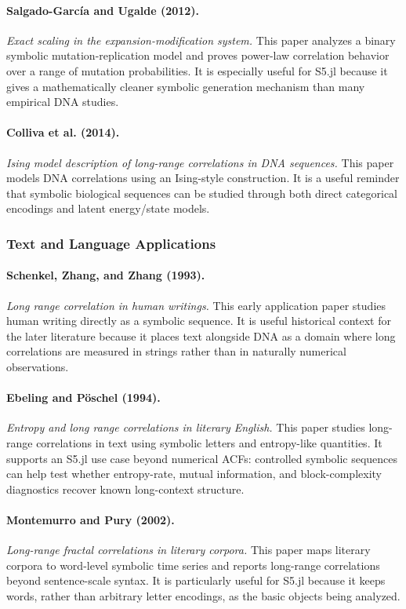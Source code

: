 \documentclass[11pt]{article}
\begin{document}
\paragraph{Salgado-García and Ugalde (2012).}
\emph{Exact scaling in the expansion-modification system.}
This paper analyzes a binary symbolic mutation-replication model and proves
power-law correlation behavior over a range of mutation probabilities. It is
especially useful for S5.jl because it gives a mathematically cleaner symbolic
generation mechanism than many empirical DNA studies.

\paragraph{Colliva et al. (2014).}
\emph{Ising model description of long-range correlations in DNA sequences.}
This paper models DNA correlations using an Ising-style construction. It is a
useful reminder that symbolic biological sequences can be studied through both
direct categorical encodings and latent energy/state models.

\subsubsection{Text and Language Applications}

\paragraph{Schenkel, Zhang, and Zhang (1993).}
\emph{Long range correlation in human writings.}
This early application paper studies human writing directly as a symbolic
sequence. It is useful historical context for the later literature because it
places text alongside DNA as a domain where long correlations are measured in
strings rather than in naturally numerical observations.

\paragraph{Ebeling and Pöschel (1994).}
\emph{Entropy and long range correlations in literary English.}
This paper studies long-range correlations in text using symbolic letters and
entropy-like quantities. It supports an S5.jl use case beyond numerical ACFs:
controlled symbolic sequences can help test whether entropy-rate, mutual
information, and block-complexity diagnostics recover known long-context
structure.

\paragraph{Montemurro and Pury (2002).}
\emph{Long-range fractal correlations in literary corpora.}
This paper maps literary corpora to word-level symbolic time series and reports
long-range correlations beyond sentence-scale syntax. It is particularly useful
for S5.jl because it keeps words, rather than arbitrary letter encodings, as the
basic objects being analyzed.
\end{document}
